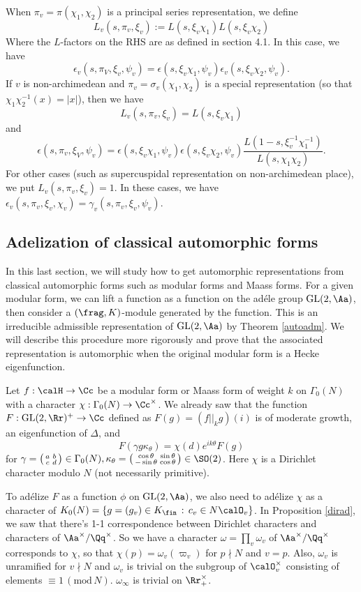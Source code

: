 \documentclass{article}
\newcommand{\GL}{\mathrm{GL}}
\newcommand{\Mod}[1]{\,(\mathrm{mod}\,#1)}
\newcommand{\smat}[4]{\left(\begin{smallmatrix} #1 & #2 \\ #3 & #4 \end{smallmatrix}\right)}
\begin{document}
When $\pi_v = \pi(\chi_1, \chi_2)$ is a principal series representation, we define 
$$
L_{v}(s, \pi_v, \xi_v) := L(s, \xi_v \chi_1)L(s, \xi_v\chi_2)
$$
Where the $L$-factors on the RHS are as defined in section 4.1. In this case, we have
$$
\epsilon_v(s, \pi_V, \xi_v, \psi_v) = \epsilon(s, \xi_v \chi_1, \psi_v) \epsilon_v(s, \xi_v \chi_2, \psi_v).
$$
If $v$ is non-archimedean and $\pi_v= \sigma_v(\chi_1, \chi_2)$ is a special representation (so that $\chi_1\chi_2^{-1}(x) = |x|$), then we have
$$
L_{v}(s, \pi_v, \xi_v) = L(s, \xi_v \chi_1)
$$
and
$$
\epsilon(s, \pi_v, \xi_V, \psi_v) = \epsilon(s, \xi_v \chi_1,\psi_v)\epsilon(s, \xi_v \chi_2, \psi_v) \frac{L(1-s, \xi_{v}^{-1}\chi_1^{-1})}{L(s, \chi_1\chi_2)}.
$$
For other cases (such as  supercuspidal representation on non-archimedean place), we put $L_{v}(s, \pi_v, \xi_v) = 1$. In these cases, we have $\epsilon_{v}(s, \pi_v, \xi_v, \chi_v) = \gamma_v(s, \pi_v, \xi_v, \psi_v)$. 





\subsection{Adelization of classical automorphic forms}

In this last section, we will study how to get automorphic representations from classical automorphic forms such as  modular forms and Maass forms. 
For a given modular form, we can lift a function as a function on the ad\'ele group $\GL(2, \Aa)$, then consider a $(\frag, K)$-module generated by the function. 
This is an irreducible admissible representation of $\GL(2, \Aa)$ by Theorem \ref{autoadm}. We will describe this procedure more rigorously and prove that the associated representation is automorphic when the original modular form is a Hecke eigenfunction. 

Let $f:\calH \to \Cc$ be a modular form or Maass form of weight $k$ on $\Gamma_0(N)$ with a character $\chi:\Gamma_0(N) \to \Cc^{\times}$. 
We already saw that the function $F:\GL(2, \Rr)^{+}\to \Cc$ defined as $F(g) = (f||_{k}g)(i)$ is of moderate growth, an eigenfunction of $\Delta$, and 
$$
F(\gamma g \kappa_\theta) = \chi(d) e^{ik\theta}F(g)
$$
for $\gamma = \smat{a}{b}{c}{d} \in \Gamma_{0}(N), \kappa_{\theta} = \smat{\cos \theta}{\sin \theta}{-\sin \theta}{\cos\theta} \in \SO(2)$. 
Here $\chi$ is a Dirichlet character modulo $N$ (not necessarily primitive). 

To ad\'elize $F$ as a function $\phi$ on $\GL(2, \Aa)$, we also need to ad\'elize $\chi$ as a character of $K_{0}(N) = \{g  = (g_{v}) \in K_{\fin}\,:\, c_{v}\in N\calO_{v}\}$. 
In Proposition \ref{dirad}, we saw that there's 1-1 correspondence between Dirichlet characters and characters of $\Aa^{\times}/\Qq^{\times}$. 
So we have a character $\omega = \prod_{v} \omega_{v}$ of $\Aa^{\times}/\Qq^{\times}$ corresponds to $\chi$, so that $\chi(p) = \omega_{v}(\varpi_{v})$ for $p\nmid N$ and $v = p$. 
Also, $\omega_{v}$ is unramified for $v\nmid N$ and $\omega_{v}$ is trivial on the subgroup of $\calO_{v}^{\times}$ consisting of elements $\equiv 1\Mod{N}$. 
$\omega_{\infty}$ is trivial on $\Rr_{+}^{\times}$. 
\end{document}
